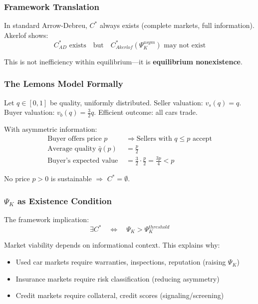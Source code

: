 \subsubsection{Framework Translation}

In standard Arrow-Debreu, $C^*$ always exists (complete markets, full information).
Akerlof shows:
\begin{equation}
C^*_{AD} \text{ exists} \quad \text{but} \quad C^*_{Akerlof}(\Psi_K^{asym}) \text{ may not exist}
\end{equation}

This is not inefficiency within equilibrium—it is \textbf{equilibrium nonexistence}.

\subsubsection{The Lemons Model Formally}

Let $q \in [0,1]$ be quality, uniformly distributed. Seller valuation: $v_s(q) = q$.
Buyer valuation: $v_b(q) = \frac{3}{2}q$. Efficient outcome: all cars trade.

With asymmetric information:
\begin{align}
\text{Buyer offers price } p &\Rightarrow \text{Sellers with } q \leq p \text{ accept} \\
\text{Average quality } \bar{q}(p) &= \frac{p}{2} \\
\text{Buyer's expected value } &= \frac{3}{2} \cdot \frac{p}{2} = \frac{3p}{4} < p
\end{align}

No price $p > 0$ is sustainable $\Rightarrow$ $C^* = \emptyset$.

\subsubsection{$\Psi_K$ as Existence Condition}

The framework implication:
\begin{equation}
\exists C^* \quad \Leftrightarrow \quad \Psi_K > \Psi_K^{threshold}
\end{equation}

Market viability depends on informational context. This explains why:
\begin{itemize}
    \item Used car markets require warranties, inspections, reputation (raising $\Psi_K$)
    \item Insurance markets require risk classification (reducing asymmetry)
    \item Credit markets require collateral, credit scores (signaling/screening)
\end{itemize}

